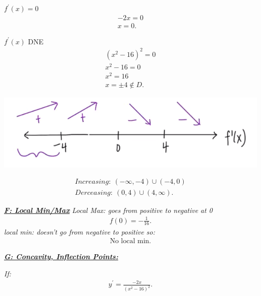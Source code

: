 \documentclass{report}
\begin{document}
  \bigbreak \noindent 
  \textit{$f^{\prime}(x) = 0$}
  \begin{align*}
    -2x = 0 \\
    \boxed{x = 0}
  .\end{align*}

  \bigbreak \noindent 
  \textit{$f^{\prime}(x)$} DNE
  \begin{align*}
    (x^{2}-16)^{2} = 0  \\
    x^{2}- 16 = 0 \\
    x^{2} = 16 \\
    \boxed{x = \pm 4 \notin D}
  .\end{align*}

  \bigbreak \noindent 

  \bigbreak \noindent 
  \begin{center}
    \includegraphics[scale=0.7]{ ./images/18.png }
  \end{center}
  \begin{align*}
    Increasing:\ (-\infty, -4) \cup (-4,0) \\
    Derceasing:\ (0,4) \cup (4,\infty)
  .\end{align*}

  \bigbreak \noindent 
  \textbf{\textit{\underline{F: Local Min/Max}}}
  \bigbreak \noindent 
  \textit{Local Max: goes from positive to negative at 0}
  \begin{align*}
    \boxed{f(0) = -\frac{1}{16}}
  .\end{align*}
  \bigbreak \noindent 
  \textit{local min: doesn't go from negative to positive so:}
  \begin{align*}
    \boxed{\text{No local min}}
  .\end{align*}

  \bigbreak \noindent 
  \textbf{\textit{\underline{G: Concavity, Inflection Points:}}}

  \bigbreak \noindent 
  \textit{If:}
  \begin{align*}
    y^{\prime} = \frac{-2x}{(x^{2}-16)^{2}}
  .\end{align*}
  
\end{document}
